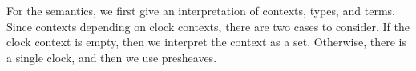 
For the semantics, we first give an interpretation of contexts, types, and terms.
Since contexts depending on clock contexts, there are two cases to consider.
If the clock context is empty, then we interpret the context as a set.
Otherwise, there is a single clock, and then we use presheaves.

\begin{code}%
\>[0]\AgdaSpace{}%
\AgdaSymbol{:}\AgdaSpace{}%
\AgdaSpace{}%
\AgdaSpace{}%
\<%
\\
\>[0]\AgdaSpace{}%
\AgdaSpace{}%
\AgdaSymbol{=}\AgdaSpace{}%
\<%
\\
\>[0]\AgdaSpace{}%
\AgdaSpace{}%
\AgdaSymbol{=}\AgdaSpace{}%
\<%
\end{code}
